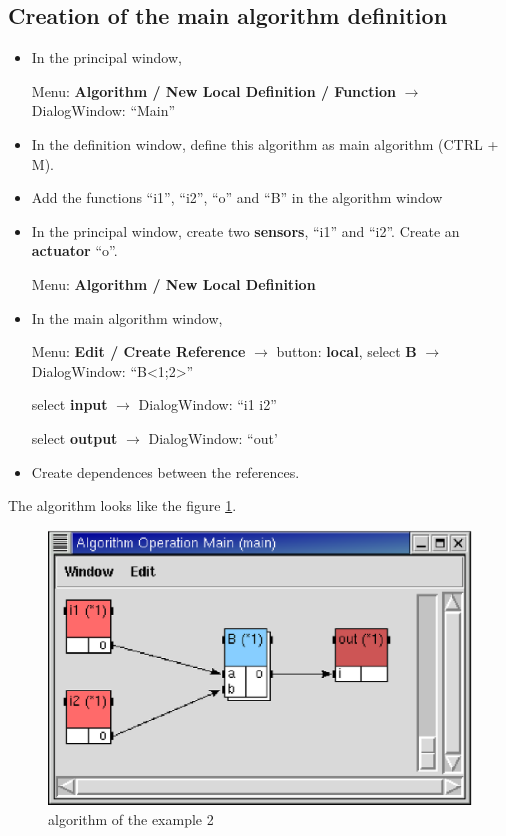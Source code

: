 \documentclass[a4paper,twoside]{report}
\begin{document}
\subsection{Creation of the main algorithm definition}
\begin{itemize}
\item In the principal window,

Menu: \textbf{Algorithm / New Local Definition / Function} $\rightarrow$
DialogWindow: ``Main''

\item In the definition window, define this algorithm as main algorithm (CTRL + M).

\item Add the functions ``i1'', ``i2'', ``o'' and ``B'' in the algorithm window

\item In the principal window, create two \textbf{sensors}, ``i1'' and
``i2''. Create an \textbf{actuator} ``o''.

Menu: \textbf{Algorithm / New Local Definition}

\item In the main algorithm window, 

Menu: \textbf{Edit / Create Reference} $\rightarrow$ button: \textbf{local},
select \textbf{B} $\rightarrow$ DialogWindow: ``B<1;2>''

\hspace{197pt} select \textbf{input} $\rightarrow$ DialogWindow: ``i1 i2''

\hspace{197pt} select \textbf{output} $\rightarrow$ DialogWindow: ``out'

\item Create dependences between the references.

\end{itemize}

The algorithm looks like the figure \ref{algo2}.
\begin{figure}[htbp]
  \begin{center} 
        \includegraphics[width=0.5\linewidth]{algorithm_ex2.eps} 
  \end{center}
  \caption{algorithm of the example 2} 
  \label{algo2}
\end{figure} 
\end{document}
